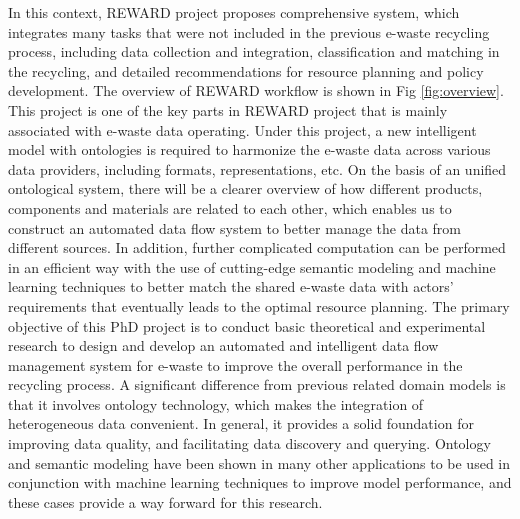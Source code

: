 \documentclass{article}
\numberwithin{equation}{section}
\begin{document}
In this context, REWARD project proposes comprehensive system, which integrates many tasks that were not included in the previous e-waste recycling process, including data collection and integration, classification and matching in the recycling, and detailed recommendations for resource planning and policy development. The overview of REWARD workflow is shown in Fig \ref{fig:overview}. This project is one of the key parts in REWARD project that is mainly associated with e-waste data operating. Under this project, a new intelligent model with ontologies is required to harmonize the e-waste data across various data providers, including formats, representations, etc. On the basis of an unified ontological system, there will be a clearer overview of how different products, components and materials are related to each other, which enables us to construct an automated data flow system to better manage the data from different sources. In addition, further complicated computation can be performed in an efficient way with the use of cutting-edge semantic modeling and machine learning techniques to better match the shared e-waste data with actors’ requirements that eventually leads to the optimal resource planning. 
The primary objective of this PhD project is to conduct basic theoretical and experimental research to design and develop an automated and intelligent data flow management system for e-waste to improve the overall performance in the recycling process. A significant difference from previous related domain models is that it involves ontology technology, which makes the integration of heterogeneous data convenient. In general, it provides a solid foundation for improving data quality, and facilitating data discovery and querying. Ontology and semantic modeling have been shown in many other applications to be used in conjunction with machine learning techniques to improve model performance, and these cases provide a way forward for this research.
\end{document}
